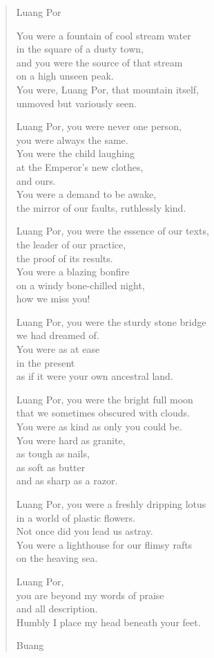 
\begin{verse}
Luang Por

You were a fountain of cool stream water\\
in the square of a dusty town,\\
and you were the source of that stream\\
on a high unseen peak.\\
You were, Luang Por, that mountain itself,\\
unmoved but variously seen.

Luang Por, you were never one person,\\
you were always the same.\\
You were the child laughing\\
at the Emperor's new clothes,\\
and ours.\\
You were a demand to be awake,\\
the mirror of our faults, ruthlessly kind.

Luang Por, you were the essence of our texts,\\
the leader of our practice,\\
the proof of its results.\\
You were a blazing bonfire\\
on a windy bone-chilled night,\\
how we miss you!

Luang Por, you were the sturdy stone bridge\\
we had dreamed of.\\
You were as at ease\\
in the present\\
as if it were your own ancestral land.

Luang Por, you were the bright full moon\\
that we sometimes obscured with clouds.\\
You were as kind as only you could be.\\
You were hard as granite,\\
as tough as nails,\\
as soft as butter\\
and as sharp as a razor.

Luang Por, you were a freshly dripping lotus\\
in a world of plastic flowers.\\
Not once did you lead us astray.\\
You were a lighthouse for our flimsy rafts\\
on the heaving sea.

Luang Por,\\
you are beyond my words of praise\\
and all description.\\
Humbly I place my head beneath your feet.

Buang
\end{verse}

